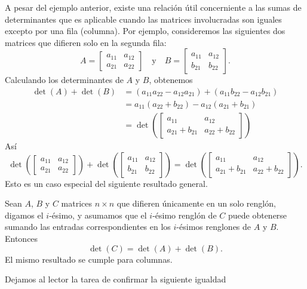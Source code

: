 A pesar del ejemplo anterior, existe una relación útil concerniente a las sumas de determinantes que es aplicable cuando las matrices involucradas son iguales excepto por una fila (columna). Por ejemplo, consideremos las siguientes dos matrices que difieren solo en la segunda fila:
$$A = \begin{bmatrix} a_{11} & a_{12} \\ a_{21} & a_{22} \end{bmatrix} \quad \text{y} \quad B = \begin{bmatrix} a_{11} & a_{12} \\ b_{21} & b_{22} \end{bmatrix}.$$
Calculando los determinantes de $A$ y $B$, obtenemos
\begin{align*}
    \det(A) + \det(B) & = (a_{11}a_{22} - a_{12}a_{21}) + (a_{11}b_{22} - a_{12}b_{21}) \\
    & = a_{11}(a_{22} + b_{22}) - a_{12}(a_{21} + b_{21}) \\
    & = \det\left(\begin{bmatrix} a_{11} & a_{12} \\ a_{21} + b_{21} & a_{22} + b_{22} \end{bmatrix}\right)
\end{align*}
Así
$$\det\left(\begin{bmatrix} a_{11} & a_{12} \\ a_{21} & a_{22} \end{bmatrix}\right) + \det\left(\begin{bmatrix} a_{11} & a_{12} \\ b_{21} & b_{22} \end{bmatrix}\right) = \det\left(\begin{bmatrix} a_{11} & a_{12} \\ a_{21} + b_{21} & a_{22} + b_{22} \end{bmatrix}\right).$$
Esto es un caso especial del siguiente resultado general.

\begin{theorem}{}{}
    Sean $A$, $B$ y $C$ matrices $n \times n$ que difieren únicamente en un solo renglón, digamos el $i$-ésimo, y asumamos que el $i$-ésimo renglón de $C$ puede obtenerse sumando las entradas correspondientes en los $i$-ésimos renglones de $A$ y $B$. Entonces
    $$\det(C) = \det(A) + \det(B).$$
    El mismo resultado se cumple para columnas.
\end{theorem}

\begin{examplebox}{}{}
    Dejamos al lector la tarea de confirmar la siguiente igualdad
    \begin{matrizn}
    \end{matrizn}
\end{examplebox}

